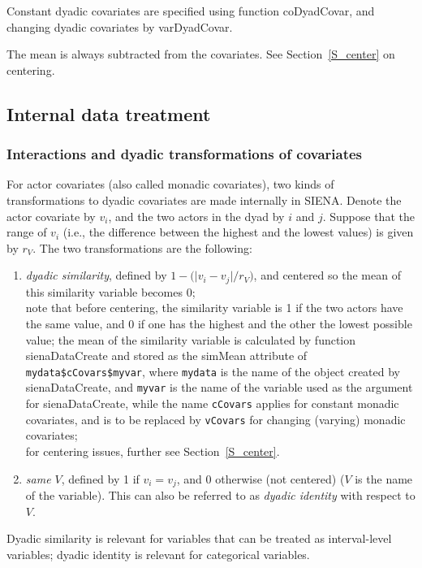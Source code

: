 \documentclass[a4paper,fleqn,11pt]{article}
\newcommand{\+}{\, + \,}
\newcommand{\sfn}[1]{\textsf{#1}}
\newcommand{\si}{{\sf SIENA}}
\begin{document}
Constant dyadic covariates are specified using function
\sfn{coDyadCovar}, and changing dyadic covariates by \sfn{varDyadCovar}.

The mean is always subtracted from the covariates.
See Section~\ref{S_center} on centering.

\subsection{Internal data treatment}
\label{S_internal}

\subsubsection{Interactions and dyadic transformations of covariates}

For actor covariates (also called monadic covariates),
two kinds of transformations to dyadic covariates
are made internally in \si. Denote the actor covariate by $v_i$,
and the two actors in the dyad by $i$ and $j$.
Suppose that the range of $v_i$ (i.e., the difference between the
highest and the lowest values) is given by $r_V$.
The two transformations are the following:
\begin{enumerate}
\item \emph{dyadic similarity}, defined by
      $ 1 - \big( \vert v_i - v_j \vert / r_V \big) $,
      and centered so the mean of this similarity variable becomes 0;\\
      note that before centering, the similarity variable is 1 if
      the two actors have the same value, and 0 if one has the highest and the
      other the lowest possible value;
      the mean of the similarity variable is calculated by function
      \sfn{sienaDataCreate} and stored as the \sfn{simMean} attribute
      of \texttt{mydata\$cCovars\$myvar}, where \texttt{mydata} is the name
      of the object created by \sfn{sienaDataCreate}, and \texttt{myvar}
      is the name of the variable used as the argument for
      \sfn{sienaDataCreate}, while the name \texttt{cCovars} applies for
      constant monadic covariates, and is to be replaced by \texttt{vCovars}
      for changing (varying) monadic covariates;\\
      for centering issues, further see Section~\ref{S_center}.
\item \emph{same $V$}, defined by 1 if $v_i = v_j$,
      and 0 otherwise (not centered) ($V$ is the name of the variable).
      This can also be referred to as \emph{dyadic identity}
      with respect to $V$.
\end{enumerate}
Dyadic similarity is relevant for variables that can be treated as
interval-level variables; dyadic identity is relevant for categorical variables.
\end{document}
